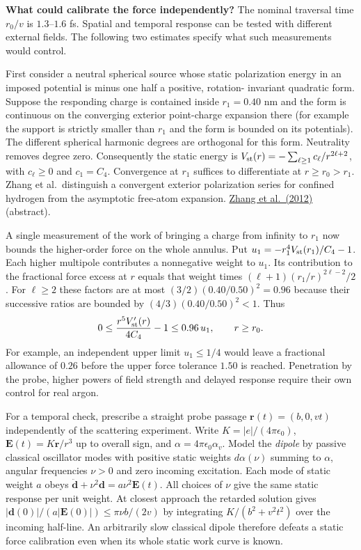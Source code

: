 \documentclass[11pt,a4paper]{article}
\begin{document}
\textbf{What could calibrate the force independently?} The nominal
traversal time \(r_0/v\) is \(1.3\)--\(1.6\) fs. Spatial and temporal
response can be tested with different external fields. The following two
estimates specify what such measurements would control.

First consider a neutral spherical source whose static polarization
energy in an imposed potential is minus one half a positive, rotation-
invariant quadratic form. Suppose the responding charge is contained
inside \(r_1=0.40\) nm and the form is continuous on the converging
exterior point-charge expansion there (for example the support is
strictly smaller than \(r_1\) and the form is bounded on its
potentials). The different spherical harmonic degrees are orthogonal for
this form. Neutrality removes degree zero. Consequently the static
energy is \(V_{\rm st}(r)=-\sum_{\ell\ge1}c_\ell/r^{2\ell+2}\), with
\(c_\ell\ge0\) and \(c_1=C_4\). Convergence at \(r_1\) suffices to
differentiate at \(r\ge r_0>r_1\). Zhang et al.~distinguish a convergent
exterior polarization series for confined hydrogen from the asymptotic
free-atom expansion. \href{https://doi.org/10.1063/1.4705279}{Zhang et
al.~(2012)} (abstract).

A single measurement of the work of bringing a charge from infinity to
\(r_1\) now bounds the higher-order force on the whole annulus. Put
\(u_1=-r_1^4V_{\rm st}(r_1)/C_4-1\). Each higher multipole contributes a
nonnegative weight to \(u_1\). Its contribution to the fractional force
excess at \(r\) equals that weight times
\((\ell+1)(r_1/r)^{2\ell-2}/2\). For \(\ell\ge2\) these factors are at
most \((3/2)(0.40/0.50)^2=0.96\) because their successive ratios are
bounded by \((4/3)(0.40/0.50)^2<1\). Thus \[
 0\le \frac{r^5 V'_{\rm st}(r)}{4C_4}-1\le0.96\,u_1,\qquad r\ge r_0 .
\] For example, an independent upper limit \(u_1\le1/4\) would leave a
fractional allowance of \(0.26\) before the upper force tolerance
\(1.50\) is reached. Penetration by the probe, higher powers of field
strength and delayed response require their own control for real argon.

For a temporal check, prescribe a straight probe passage
\(\mathbf r(t)=(b,0,vt)\) independently of the scattering experiment.
Write \(K=|e|/(4\pi\epsilon_0)\), \(\mathbf E(t)=K\mathbf r/r^3\) up to
overall sign, and \(\alpha=4\pi\epsilon_0\alpha_v\). Model the
\emph{dipole} by passive classical oscillator modes with positive static
weights \(d\alpha(\nu)\) summing to \(\alpha\), angular frequencies
\(\nu>0\) and zero incoming excitation. Each mode of static weight \(a\)
obeys \(\ddot{\mathbf d}+\nu^2\mathbf d=a\nu^2\mathbf E(t)\). All
choices of \(\nu\) give the same static response per unit weight. At
closest approach the retarded solution gives
\(|\mathbf d(0)|/(a|\mathbf E(0)|)\le\pi\nu b/(2v)\) by integrating
\(K/(b^2+v^2t^2)\) over the incoming half-line. An arbitrarily slow
classical dipole therefore defeats a static force calibration even when
its whole static work curve is known.
\end{document}

